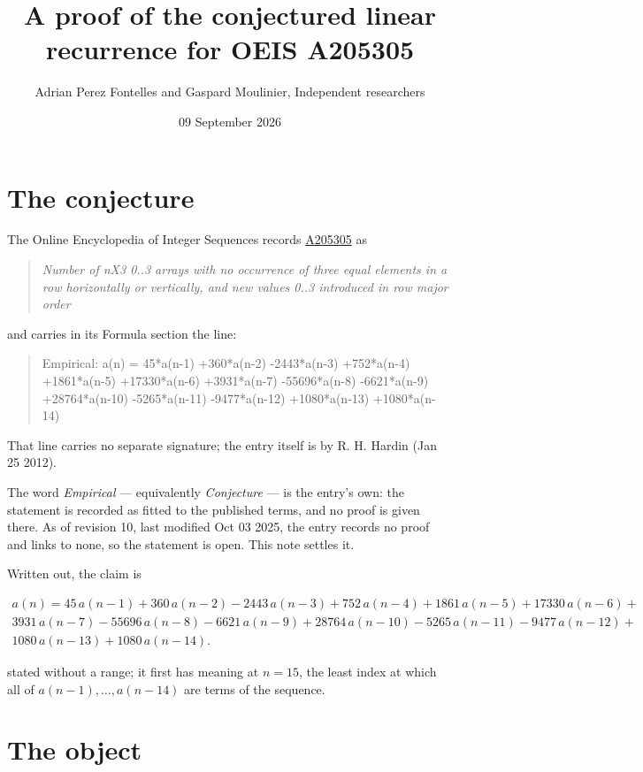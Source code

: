 \documentclass[11pt]{article}
\title{A proof of the conjectured linear recurrence for OEIS A205305}
\author{Adrian Perez Fontelles and Gaspard Moulinier, Independent researchers}
\date{09 September 2026}
\theoremstyle{definition}
\begin{document}
\maketitle
\section{The conjecture}

The Online Encyclopedia of Integer Sequences records \href{https://oeis.org/A205305}{A205305} as

\begin{quote}\itshape Number of nX3 0..3 arrays with no occurrence of three equal elements in a row horizontally or vertically, and new values 0..3 introduced in row major order\end{quote}

and carries in its Formula section the line:

\begin{quote}\ttfamily Empirical: a(n) = 45*a(n-1) +360*a(n-2) -2443*a(n-3) +752*a(n-4) +1861*a(n-5) +17330*a(n-6) +3931*a(n-7) -55696*a(n-8) -6621*a(n-9) +28764*a(n-10) -5265*a(n-11) -9477*a(n-12) +1080*a(n-13) +1080*a(n-14)\end{quote}

That line carries no separate signature; the entry itself is by R. H. Hardin (Jan 25 2012).

The word {\itshape Empirical} --- equivalently {\itshape Conjecture} --- is the entry's own: the statement is recorded as fitted to the published terms, and no proof is given there. As of revision 10, last modified Oct 03 2025, the entry records no proof and links to none, so the statement is open. This note settles it.

Written out, the claim is

\begin{multline*} a(n) = 45\,a(n-1) + 360\,a(n-2) - 2443\,a(n-3) + 752\,a(n-4) + 1861\,a(n-5) + 17330\,a(n-6) + \\ 3931\,a(n-7) - 55696\,a(n-8) - 6621\,a(n-9) + 28764\,a(n-10) - 5265\,a(n-11) - 9477\,a(n-12) + \\ 1080\,a(n-13) + 1080\,a(n-14). \end{multline*}

stated without a range; it first has meaning at $n = 15$, the least index at which all of $a(n-1),\dots,a(n-14)$ are terms of the sequence.

\section{The object}
\end{document}
